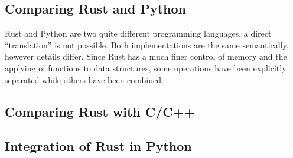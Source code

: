 \subsection{Comparing Rust and Python}\label{sec:rustvspython}

Rust and Python are two quite different programming languages, a direct
``translation'' is not possible. Both implementations are the same semantically,
however details differ. Since Rust has a much finer control of memory and the
applying of functions to data structures, some operations have been explicitly
separated while others have been combined.

\subsection{Comparing Rust with C/C++}\label{sec:rustvscc++}







\subsection{Integration of Rust in Python}\label{sec:integration}








